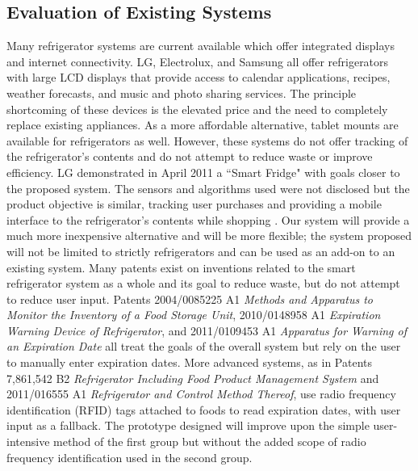 \documentclass[11pt,letterpaper]{article}
\begin{document}
\subsection{Evaluation of Existing Systems}
Many refrigerator systems are current available which offer integrated displays and internet connectivity. LG, Electrolux, and Samsung all offer refrigerators with large LCD displays that provide access to calendar applications, recipes, weather forecasts, and music and photo sharing services. The principle shortcoming of these devices is the elevated price and the need to completely replace existing appliances. As a more affordable alternative, tablet mounts are available for refrigerators as well.
However, these systems do not offer tracking of the refrigerator's contents and do not attempt to reduce waste or improve efficiency. LG demonstrated in April 2011 a ``Smart Fridge" with goals closer to the proposed system. The sensors and algorithms used were not disclosed but the product objective is similar, tracking user purchases and providing a mobile interface to the refrigerator's contents while shopping \cite{lg}. Our system will provide a much more inexpensive alternative and will be more flexible; the system proposed will not be limited to strictly refrigerators and can be used as an add-on to an existing system.
\newline \quad \newline
Many patents exist on inventions related to the smart refrigerator system as a whole and its goal to reduce waste, but do not attempt to reduce user input. Patents 2004/0085225 A1 \emph{Methods and Apparatus to Monitor the Inventory of a Food Storage Unit}, 2010/0148958 A1 \emph{Expiration Warning Device of Refrigerator}, and 2011/0109453 A1 \emph{Apparatus for Warning of an Expiration Date} all treat the goals of the overall system but rely on the user to manually enter expiration dates. More advanced systems, as in Patents 7,861,542 B2 \emph{Refrigerator Including Food Product Management System} and 2011/016555 A1 \emph {Refrigerator and Control Method Thereof}, use radio frequency identification (RFID) tags attached to foods to read expiration dates, with user input as a fallback. The prototype designed will improve upon the simple user-intensive method of the first group but without the added scope of radio frequency identification used in the second group.
\end{document}
